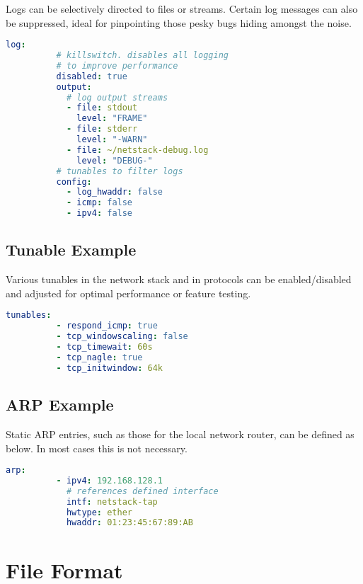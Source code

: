 \begin{appendices}
        Logs can be selectively directed to files or streams. Certain log messages can also be suppressed, ideal for pinpointing those pesky bugs hiding amongst the noise.

        \begin{lstlisting}[language=yaml,gobble=8]
        log:
          # killswitch. disables all logging
          # to improve performance
          disabled: true
          output:
            # log output streams
            - file: stdout
              level: "FRAME"
            - file: stderr
              level: "-WARN"
            - file: ~/netstack-debug.log
              level: "DEBUG-"
          # tunables to filter logs
          config:
            - log_hwaddr: false
            - icmp: false
            - ipv4: false
        \end{lstlisting}

        \subsection{Tunable Example}\label{tunable-example}

        Various tunables in the network stack and in protocols can be enabled/disabled and adjusted for optimal performance or feature testing.

        \begin{lstlisting}[language=yaml,gobble=8]
        tunables:
          - respond_icmp: true
          - tcp_windowscaling: false
          - tcp_timewait: 60s
          - tcp_nagle: true
          - tcp_initwindow: 64k
        \end{lstlisting}

        \vfil

        \subsection{ARP Example}\label{arp-example}

        Static ARP entries, such as those for the local network router, can be defined as below. In most cases this is not necessary.

        \begin{lstlisting}[language=yaml,gobble=8]
        arp:
          - ipv4: 192.168.128.1
            # references defined interface
            intf: netstack-tap
            hwtype: ether
            hwaddr: 01:23:45:67:89:AB
        \end{lstlisting}

    \section{File Format}\label{file-format}


\end{appendices}
